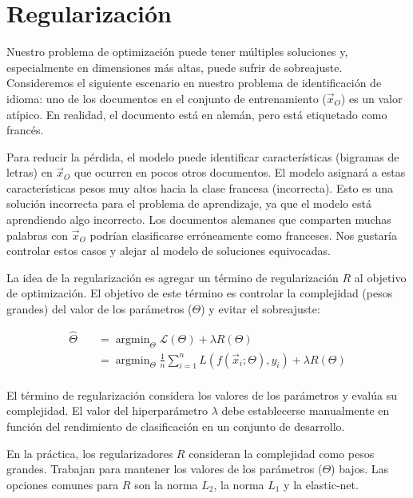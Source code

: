 \section{Regularización}
Nuestro problema de optimización puede tener múltiples soluciones y, especialmente en dimensiones más altas, puede sufrir de sobreajuste. Consideremos el siguiente escenario en nuestro problema de identificación de idioma: uno de los documentos en el conjunto de entrenamiento ($\vec{x}_O$) es un valor atípico. En realidad, el documento está en alemán, pero está etiquetado como francés.

Para reducir la pérdida, el modelo puede identificar características (bigramas de letras) en $\vec{x}_O$ que ocurren en pocos otros documentos. El modelo asignará a estas características pesos muy altos hacia la clase francesa (incorrecta). Esto es una solución incorrecta para el problema de aprendizaje, ya que el modelo está aprendiendo algo incorrecto. Los documentos alemanes que comparten muchas palabras con $\vec{x}_O$ podrían clasificarse erróneamente como franceses. Nos gustaría controlar estos casos y alejar al modelo de soluciones equivocadas.

La idea de la regularización es agregar un término de regularización $R$ al objetivo de optimización. El objetivo de este término es controlar la complejidad (pesos grandes) del valor de los parámetros ($\Theta$) y evitar el sobreajuste:

\begin{equation}
\begin{split}
\hat{\Theta} \quad & = \operatorname{argmin}_{\Theta} \mathcal{L}(\Theta) + \lambda R(\Theta) \\
\quad & = \operatorname{argmin}_{\Theta} \frac{1}{n} \sum_{i=1}^n L(f(\vec{x}_i;\Theta), y_i) + \lambda R(\Theta) \\
\end{split}
\end{equation}

El término de regularización considera los valores de los parámetros y evalúa su complejidad. El valor del hiperparámetro $\lambda$ debe establecerse manualmente en función del rendimiento de clasificación en un conjunto de desarrollo.

En la práctica, los regularizadores $R$ consideran la complejidad como pesos grandes. Trabajan para mantener los valores de los parámetros ($\Theta$) bajos. Las opciones comunes para $R$ son la norma $L_2$, la norma $L_1$ y la elastic-net.

